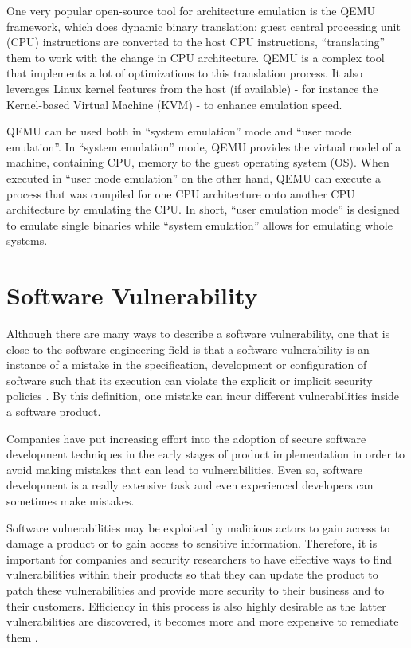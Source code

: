 One very popular open-source tool for architecture emulation is the QEMU \cite{qemu} framework, which does dynamic binary translation: guest central processing unit (CPU) instructions are converted to the host CPU instructions, ``translating'' them to work with the change in CPU architecture. QEMU is a complex tool that implements a lot of optimizations to this translation process. It also leverages Linux kernel features from the host (if available) - for instance the Kernel-based Virtual Machine (KVM) - to enhance emulation speed.

QEMU can be used both in ``system emulation'' mode and ``user mode emulation''. In ``system emulation'' mode, QEMU provides the virtual model of a machine, containing CPU, memory to the guest operating system (OS). When executed in ``user mode emulation'' on the other hand, QEMU can execute a process that was compiled for one CPU architecture onto another CPU architecture by emulating the CPU. In short, ``user emulation mode'' is designed to emulate single binaries while ``system emulation'' allows for emulating whole systems.

\section{Software Vulnerability}

Although there are many ways to describe a software vulnerability, one that is close to the software engineering field is that a software vulnerability is an instance of a mistake in the specification, development or configuration of software such that its execution can violate the explicit or implicit security policies \cite{vuln-discovery}. By this definition, one mistake can incur different vulnerabilities inside a software product.

Companies have put  increasing  effort into the adoption of secure software development techniques in the early stages of product implementation in order to avoid making mistakes that can lead to vulnerabilities. Even so, software development is a really extensive task and even experienced developers can sometimes make mistakes.

Software vulnerabilities may be exploited by malicious actors to gain access to damage a product or to gain access to sensitive information. Therefore, it is important for companies and security researchers to have effective ways to find vulnerabilities within their products so that they can update the product to patch these vulnerabilities and provide more security to their business and to their customers. Efficiency in this process is also highly desirable as the latter vulnerabilities are discovered, it becomes more and more expensive to remediate them  \cite{soft-eng-economics}.

